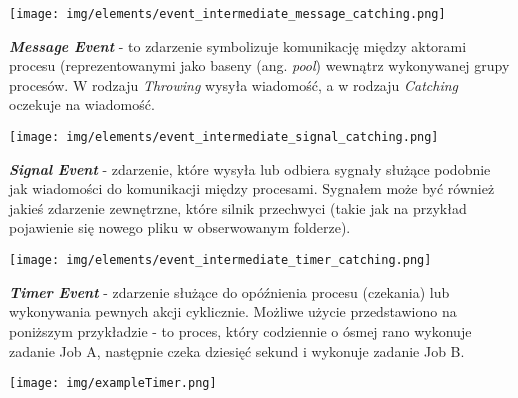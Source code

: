 \documentclass[declaration,shortabstract,mgr]{iithesis}
\begin{document}
\noindent\begin{minipage}[t]{0.075\textwidth}\vspace{0pt}
\texttt{[image: img/elements/event\_intermediate\_message\_catching.png]}
\end{minipage}\hfill
\begin{minipage}[t]{0.875\textwidth}\vspace{0pt}
\textbf{\textit{Message Event}} - to zdarzenie symbolizuje komunikację między aktorami procesu (reprezentowanymi jako baseny (ang. \textit{pool}) wewnątrz wykonywanej grupy procesów. W rodzaju \textit{Throwing} wysyła wiadomość, a w rodzaju \textit{Catching} oczekuje na wiadomość.
\end{minipage}

\vspace{\mypointsep}

\noindent\begin{minipage}[t]{0.075\textwidth}\vspace{0pt}
\texttt{[image: img/elements/event\_intermediate\_signal\_catching.png]}
\end{minipage}\hfill
\begin{minipage}[t]{0.875\textwidth}\vspace{0pt}
\textbf{\textit{Signal Event}} - zdarzenie, które wysyła lub odbiera sygnały służące podobnie jak wiadomości do komunikacji między procesami. Sygnałem może być również jakieś zdarzenie zewnętrzne, które silnik przechwyci (takie jak na przykład pojawienie się nowego pliku w obserwowanym folderze).
\end{minipage}

\vspace{\mypointsep}

\noindent\begin{minipage}[t]{0.075\textwidth}\vspace{0pt}
\texttt{[image: img/elements/event\_intermediate\_timer\_catching.png]}
\end{minipage}\hfill
\begin{minipage}[t]{0.875\textwidth}\vspace{0pt}
\textbf{\textit{Timer Event}} - zdarzenie służące do opóźnienia procesu (czekania) lub wykonywania pewnych akcji cyklicznie. Możliwe użycie przedstawiono na poniższym przykładzie - to proces, który codziennie o ósmej rano wykonuje zadanie Job A, następnie czeka dziesięć sekund i wykonuje zadanie Job B.
\begin{center}
\texttt{[image: img/exampleTimer.png]}
\end{center}
\end{minipage}
\end{document}
